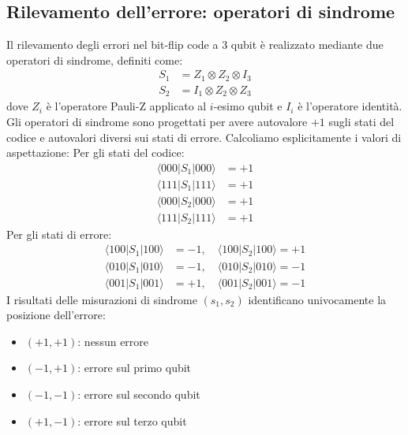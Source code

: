 \documentclass[a4paper,12pt]{report}
\theoremstyle{plain}
\begin{document}
\subsection{Rilevamento dell'errore: operatori di sindrome}
Il rilevamento degli errori nel bit-flip code a 3 qubit è realizzato mediante due operatori di sindrome, definiti come:
\begin{align}
S_1 &= Z_1 \otimes Z_2 \otimes I_3 \\
S_2 &= I_1 \otimes Z_2 \otimes Z_3
\end{align}
dove $Z_i$ è l'operatore Pauli-Z applicato al $i$-esimo qubit e $I_i$ è l'operatore identità.
Gli operatori di sindrome sono progettati per avere autovalore $+1$ sugli stati del codice e autovalori diversi sui stati di errore. Calcoliamo esplicitamente i valori di aspettazione:
Per gli stati del codice:
\begin{align}
\langle 000 | S_1 | 000 \rangle &= +1 \\
\langle 111 | S_1 | 111 \rangle &= +1 \\
\langle 000 | S_2 | 000 \rangle &= +1 \\
\langle 111 | S_2 | 111 \rangle &= +1
\end{align}
Per gli stati di errore:
\begin{align}
\langle 100 | S_1 | 100 \rangle &= -1, \quad \langle 100 | S_2 | 100 \rangle = +1 \\
\langle 010 | S_1 | 010 \rangle &= -1, \quad \langle 010 | S_2 | 010 \rangle = -1 \\
\langle 001 | S_1 | 001 \rangle &= +1, \quad \langle 001 | S_2 | 001 \rangle = -1
\end{align}
I risultati delle misurazioni di sindrome $(s_1, s_2)$ identificano univocamente la posizione dell'errore:
\begin{itemize}
\item $(+1, +1)$: nessun errore
\item $(-1, +1)$: errore sul primo qubit
\item $(-1, -1)$: errore sul secondo qubit  
\item $(+1, -1)$: errore sul terzo qubit
\end{itemize}
\end{document}
